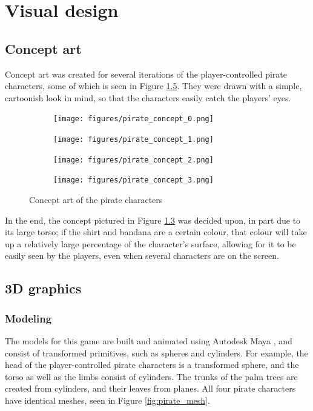 \chapter{Visual design}\label{ch:visualDesign}
\section{Concept art}
Concept art was created for several iterations of the player-controlled pirate characters, some of which is seen in Figure \ref{fig:pirate_concepts}. They were drawn with a simple, cartoonish look in mind, so that the characters easily catch the players' eyes. 

\begin{figure}[h!]
    \centering
    \begin{subfigure}[b]{0.2\textwidth}
		\centering        
        \texttt{[image: figures/pirate\_concept\_0.png]}\caption{ \label{fig:pirate_concept_0}}
    \end{subfigure}
    \begin{subfigure}[b]{0.2\textwidth}
    	\centering
        \texttt{[image: figures/pirate\_concept\_1.png]}\caption{ \label{fig:pirate_concept_1}}
    \end{subfigure}
    \begin{subfigure}[b]{0.2\textwidth}
    	\centering
        \texttt{[image: figures/pirate\_concept\_2.png]}\caption{ \label{fig:pirate_concept_2}}
    \end{subfigure}
    \begin{subfigure}[b]{0.2\textwidth}
    	\centering
        \texttt{[image: figures/pirate\_concept\_3.png]}\caption{ \label{fig:pirate_concept_3}}
    \end{subfigure}
    \caption{Concept art of the pirate characters}\label{fig:pirate_concepts}
\end{figure}

In the end, the concept pictured in Figure \ref{fig:pirate_concept_2} was decided upon, in part due to its large torso; if the shirt and bandana are a certain colour, that colour will take up a relatively large percentage of the character's surface, allowing for it to be easily seen by the players, even when several characters are on the screen. 

\section{3D graphics}

\subsection{Modeling}
The models for this game are built and animated using Autodesk Maya \cite{Autodesk}, and consist of transformed primitives, such as spheres and cylinders. For example, the head of the player-controlled pirate characters is a transformed sphere, and the torso as well as the limbs consist of cylinders. The trunks of the palm trees are created from cylinders, and their leaves from planes. All four pirate characters have identical meshes, seen in Figure \ref{fig:pirate_mesh}.

